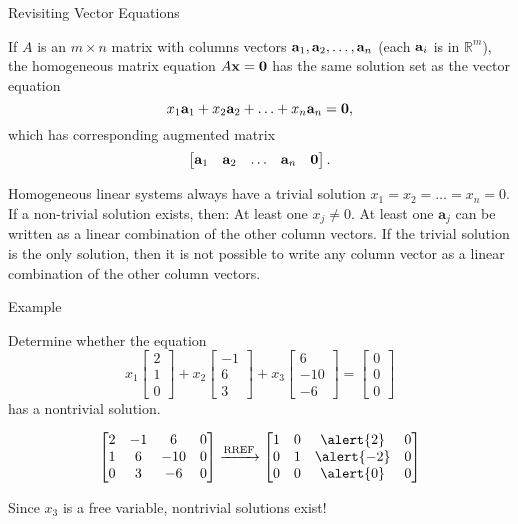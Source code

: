\documentclass[xcolor=dvipsnames,aspectratio=169,t]{beamer}
\begin{document}
\begin{frame}{Revisiting Vector Equations}

  {\small
  \bbox
  If $A$ is an $m \times n$ matrix with columns vectors $\mathbf{a}_1, \mathbf{a}_2, \ldots , \mathbf{a}_n$ (each $\mathbf{a}_i$ is in $\mathbb{R}^m$), the homogeneous matrix equation $A\mathbf{x} = \mathbf{0}$ has the same solution set as the vector equation
  \[ x_1  \mathbf{a}_1 + x_2  \mathbf{a}_2  + \ldots + x_n  \mathbf{a}_n = \mathbf{0}, \]
  which has corresponding augmented matrix
  \[ \begin{bmatrix} \mathbf{a}_1 & \mathbf{a}_2 & \ldots & \mathbf{a}_n & \mathbf{0} \end{bmatrix}. \]
  \ebox
  }

   \bi
   \ii Homogeneous linear systems always have a trivial solution $x_1=x_2= \ldots = x_n =0$.
   \ii If a non-trivial solution exists, then:
   \bi
   \ii At least one $x_j \ne 0$.
   \ii At least one $\mathbf{a}_j$ can be written as a linear combination of the other column vectors.
   \ei
   \ii If the trivial solution is the only solution, then it is not possible to write any column vector as a linear combination of the other column vectors. 
\ei 
   
\end{frame}

\begin{frame}[fragile]{Example}

  Determine whether the equation
  \[ x_1 \begin{bmatrix} 2 \\ 1 \\ 0 \end{bmatrix}  +
  x_2 \begin{bmatrix} -1 \\ 6 \\ 3 \end{bmatrix} +
  x_3 \begin{bmatrix}  6 \\ -10 \\ -6 \end{bmatrix} =
  \begin{bmatrix} 0 \\ 0 \\ 0 \end{bmatrix} \]
  has a nontrivial solution.
  \pause

  \[ \begin{bmatrix}
    2 & -1 & 6 & 0\\
    1 & 6 & -10 & 0\\
    0 & 3 & -6 & 0
  \end{bmatrix} \xrightarrow{\text{RREF}}
  \begin{bmatrix}
    1 & 0 & \alert{2} & 0 \\
    0 & 1 & \alert{-2} & 0\\
    0 & 0 & \alert{0} & 0 \end{bmatrix} \]
    \pause

  Since $x_3$ is a \alert{free variable}, nontrivial solutions exist!
  
\end{frame}
\end{document}
